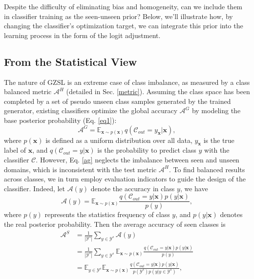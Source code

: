 \documentclass{article}
\begin{document}
	Despite the difficulty of eliminating bias and homogeneity, can we include them in classifier training as the seen-unseen prior? Below, we'll illustrate how, by changing the classifier's optimization target, we can integrate this prior into the learning process in the form of the logit adjustment.
	\subsection{From the Statistical View}
The nature of GZSL is an extreme case of class imbalance, as measured by a class balanced metric $\mathcal{A}^H$ (detailed in Sec. \ref{metric}). Assuming the class space has been completed by a set of pseudo unseen class samples generated by the trained generator, existing classifiers optimize the global accuracy $\mathcal{A}^G$ by modeling the base posterior probability (Eq. \ref{eq1}):
\vspace{-0.3ex}
    \begin{equation}
    \mathcal{A}^G=\mathbb{E}_{\mathbf{x}\sim p(\mathbf{x})} q(\mathcal{C}_{out}=y_{\mathbf{x}}|\mathbf{x}),
    \label{ag}
    \end{equation}
where $p(\mathbf{x})$ is defined as a uniform distribution over all data, $y_{\mathbf{x}}$ is the true label of $\mathbf{x}$, and $q(\mathcal{C}_{out}=y|\mathbf{x})$ is the probability to predict class $y$ with the classifier $\mathcal{C}$. However, Eq. \ref{ag} neglects the imbalance between seen and unseen domains, which is inconsistent with the test metric $\mathcal{A}^H$. To find balanced results across classes, we in turn employ evaluation indicators to guide the design of the classifier. Indeed, let $\mathcal{A}(y)$ denote the accuracy in class $y$, we have \cite{collell2016reviving}
\vspace{-0.5ex}
	\begin{equation}
	\mathcal{A}(y)=\mathbb{E}_{\mathbf{x}\sim p(\mathbf{x})}\frac{ q(\mathcal{C}_{out}=y|\mathbf{x})p(y|\mathbf{x})}{p(y)},
    \label{eq3}
	\end{equation}
	where $p(y)$ represents the statistics frequency of class $y$, and $p(y|\mathbf{x})$ denotes the real posterior probability. Then the average accuracy of seen classes is
    \vspace{-0.2ex}
	\begin{equation}
	\begin{aligned}
\mathcal{A}^S&=\frac{1}{|\mathcal{Y}^s|} \sum_{y \in \mathcal{Y}^s} \mathcal{A}(y)\\
	&=\frac{1}{|\mathcal{Y}^s|} \sum_{y \in \mathcal{Y}^s}\mathbb{E}_{\mathbf{x}\sim p(\mathbf{x})}\frac{ q(\mathcal{C}_{out}=y|\mathbf{x})p(y|\mathbf{x})}{p(y)}\\
	&= \mathbb{E}_{y\in \mathcal{Y}^s}\mathbb{E}_{\mathbf{x}\sim p(\mathbf{x})}\frac{ q(\mathcal{C}_{out}=y|\mathbf{x})p(y|\mathbf{x})}{p(\mathcal{Y}^s)p(y|y\in \mathcal{Y}^s)},
	\end{aligned}
    \label{eq4}
	\end{equation}
\end{document}
